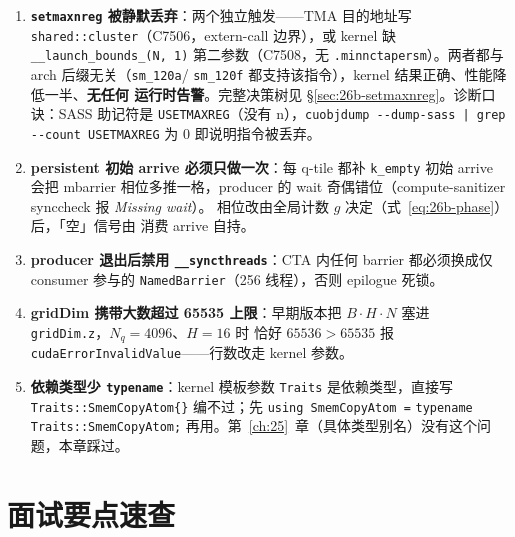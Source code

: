 \begin{enumerate}[itemsep=2pt]
  \item \textbf{\texttt{setmaxnreg} 被静默丢弃}：两个独立触发——TMA 目的地址写
        \texttt{shared::cluster}（C7506，extern-call 边界），或 kernel 缺
        \texttt{\_\_launch\_\allowbreak{}bounds\_\allowbreak{}(N,~1)} 第二参数（C7508，无
        \texttt{.minnctapersm}）。两者都与 arch 后缀无关（\texttt{sm\_120a}/
        \texttt{sm\_120f} 都支持该指令），kernel 结果正确、性能降低一半、\textbf{无任何
        运行时告警}。完整决策树见 \S\ref{sec:26b-setmaxnreg}。诊断口诀：SASS
        助记符是 \texttt{USETMAXREG}（没有 n），\texttt{cuobjdump -{}-dump-sass |
        grep -{}-count USETMAXREG} 为 0 即说明指令被丢弃。
  \item \textbf{persistent 初始 arrive 必须只做一次}：每 q-tile 都补
        \texttt{k\_empty} 初始 arrive 会把 mbarrier 相位多推一格，producer 的
        wait 奇偶错位（compute-sanitizer synccheck 报 \emph{Missing wait}）。
        相位改由全局计数 $g$ 决定（式~\eqref{eq:26b-phase}）后，「空」信号由
        消费 arrive 自持。
  \item \textbf{producer 退出后禁用 \texttt{\_\_syncthreads}}：CTA 内任何
        barrier 都必须换成仅 consumer 参与的
        \texttt{NamedBarrier}（256 线程），否则 epilogue 死锁。
  \item \textbf{gridDim 携带大数超过 65535 上限}：早期版本把
        $B\cdot H\cdot N$ 塞进 \texttt{gridDim.z}，$N_q{=}4096$、$H{=}16$ 时
        恰好 $65536 > 65535$ 报 \texttt{cudaErrorInvalidValue}——行数改走
        kernel 参数。
  \item \textbf{依赖类型少 \texttt{typename}}：kernel 模板参数
        \texttt{Traits} 是依赖类型，直接写
        \texttt{Traits::SmemCopyAtom\{\}} 编不过；先
        \texttt{using SmemCopyAtom =} \texttt{typename Traits::SmemCopyAtom;}
        再用。第~\ref{ch:25}~章（具体类型别名）没有这个问题，本章踩过。
\end{enumerate}

\section{面试要点速查}\label{sec:26b-interview}

